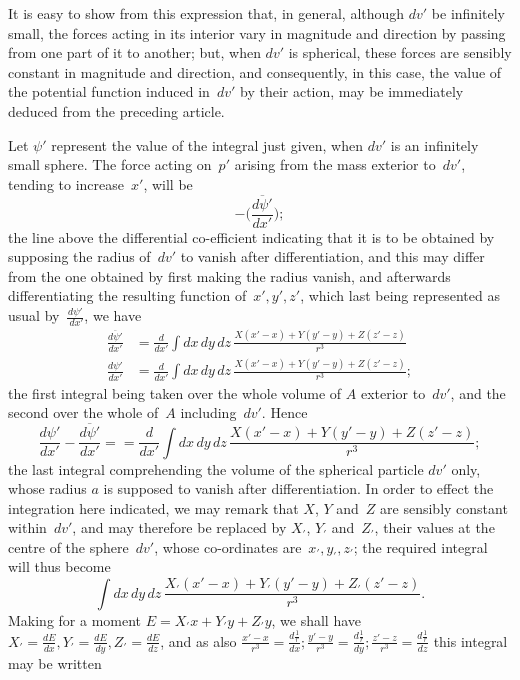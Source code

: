 \documentclass[11pt,notitlepage]{amsart}
\begin{document}
It is easy to show from this expression that, in general, although $dv'$
be infinitely small, the forces acting in its interior vary in magnitude and 
direction by passing from one part of it to another; but,
when $dv'$ is spherical,
these forces are sensibly constant in magnitude and direction, and consequently,
in this case, the value of the potential function
induced in~$dv'$ by their action,
may be immediately deduced from the preceding article.

Let $\psi'$ represent the value of the integral just given, when $dv'$ is an
infinitely small sphere. The force acting on~$p'$ arising from the mass exterior
to~$dv'$, tending to increase~$x'$, will be
\[
-\biggl(\frac{\overline{d\psi'}}{dx'}\biggl);
\]
the line above the differential co-efficient
indicating that it is to be obtained
by supposing the radius of~$dv'$ to vanish after differentiation,
and this may
differ from the one obtained by first making the radius vanish, and afterwards
differentiating the resulting function of~$x',y',z'$,
which last being represented
as usual by~$\frac{d\psi'}{~dx'}$, we have
\[
\begin{aligned}
\frac{\overline{d\psi'}}{dx'} &=
\frac{d}{dx'}\int dx\,dy\,dz\,\frac{X(x'-x)+Y(y'-y)+Z(z'-z)}{r^3}\\
\frac{{d\psi'}}{dx'} &=
\frac{d}{dx'}\int dx\,dy\,dz\,\frac{X(x'-x)+Y(y'-y)+Z(z'-z)}{r^3};
\end{aligned}
\]
the first integral being taken over the whole volume of $A$ exterior to~$dv'$,
and the second over the whole of~$A$ including~$dv'$. Hence
\[
\frac{{d\psi'}}{dx'}-\frac{\overline{d\psi'}}{dx'}=
=\frac{d}{dx'}\int dx\,dy\,dz\,\frac{X(x'-x)+Y(y'-y)+Z(z'-z)}{r^3};
\]
the last integral comprehending the volume of the spherical particle $dv'$ only,
whose radius $a$ is supposed to vanish after differentiation. In order to effect
the integration here indicated, we may remark that $X$, $Y$ and~$Z$ are sensibly
constant within~$dv'$, and may therefore be replaced by
$X_\prime$, $Y_\prime$ and~$Z_\prime$, their
values at the centre of the sphere~$dv'$, whose co-ordinates
are~$x_\prime,y_\prime,z_\prime$;
the required integral will thus become
\[
\int dx\,dy\,dz\,\frac{X_\prime(x'-x)+Y_\prime(y'-y)+Z_\prime(z'-z)}{r^3}.
\]
Making for a moment $E=X_\prime x+Y_\prime y+Z_\prime y$,
we shall have $X_\prime=\frac{dE}{dx},Y_\prime=\frac{dE}{dy},Z_\prime=\frac{dE}{dz}$,
and as also $\frac{x'-x}{r^3}=\frac{d\frac1r}{dx};
\frac{y'-y}{r^3}=\frac{d\frac1r}{dy};
\frac{z'-z}{r^3}=\frac{d\frac1r}{dz}$
this integral may be written
\end{document}
